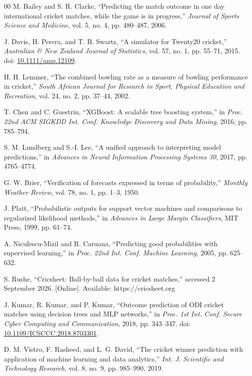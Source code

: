 \documentclass[conference]{IEEEtran}
\begin{document}
\begin{thebibliography}{00}
 M. Bailey and S. R. Clarke, ``Predicting the match
outcome in one day international cricket matches, while the game is in
progress,'' \emph{Journal of Sports Science and Medicine}, vol. 5,
no. 4, pp. 480--487, 2006.

 J. Davis, H. Perera, and T. B. Swartz, ``A simulator
for Twenty20 cricket,'' \emph{Australian \& New Zealand Journal of
Statistics}, vol. 57, no. 1, pp. 55--71, 2015. doi: \href{https://doi.org/10.1111/anzs.12109}{10.1111/anzs.12109}.

 H. H. Lemmer, ``The combined bowling rate as a
measure of bowling performance in cricket,'' \emph{South African Journal
for Research in Sport, Physical Education and Recreation}, vol. 24,
no. 2, pp. 37--44, 2002.

 T. Chen and C. Guestrin, ``XGBoost: A scalable tree
boosting system,'' in \emph{Proc. 22nd ACM SIGKDD Int. Conf. Knowledge
Discovery and Data Mining}, 2016, pp. 785--794.

 S. M. Lundberg and S.-I. Lee, ``A unified
approach to interpreting model predictions,'' in \emph{Advances in
Neural Information Processing Systems 30}, 2017, pp. 4765--4774.

 G. W. Brier, ``Verification of forecasts expressed
in terms of probability,'' \emph{Monthly Weather Review}, vol. 78,
no. 1, pp. 1--3, 1950.

 J. Platt, ``Probabilistic outputs for support vector
machines and comparisons to regularized likelihood methods,'' in
\emph{Advances in Large Margin Classifiers}, MIT Press, 1999,
pp. 61--74.

 A. Niculescu-Mizil and R. Caruana, ``Predicting
good probabilities with supervised learning,'' in \emph{Proc. 22nd Int.
Conf. Machine Learning}, 2005, pp. 625--632.

 S. Rushe, ``Cricsheet: Ball-by-ball data for cricket
matches,'' accessed 2 September 2026. [Online]. Available:
https://cricsheet.org

 J. Kumar, R. Kumar, and P. Kumar, ``Outcome
prediction of ODI cricket matches using decision trees and MLP
networks,'' in \emph{Proc. 1st Int. Conf. Secure Cyber Computing and
Communication}, 2018, pp. 343--347. doi: \href{https://doi.org/10.1109/ICSCCC.2018.8703301}{10.1109/ICSCCC.2018.8703301}.

 D. M. Vistro, F. Rasheed, and L. G. David, ``The
cricket winner prediction with application of machine learning and data
analytics,'' \emph{Int. J. Scientific and Technology Research}, vol. 8,
no. 9, pp. 985--990, 2019.


\end{thebibliography}
\end{document}
